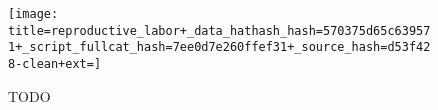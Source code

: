 \begin{figure}[!t]
\begin{center}

\texttt{[image: title=reproductive\_labor+\_data\_hathash\_hash=570375d65c639571+\_script\_fullcat\_hash=7ee0d7e260ffef31+\_source\_hash=d53f428-clean+ext=]}

\caption{
TODO
}
\label{fig:reproductive_labor}
\end{center}
\end{figure}
